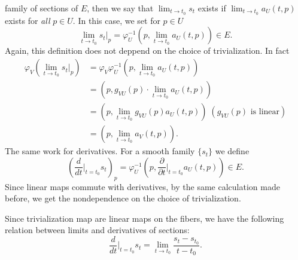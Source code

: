 family of sections of $E$, then we say that $\lim_{t\to t_0}s_t$ exists if $\lim_{t\to t_0}a_U(t,p)$ exists for \textit{all} $p \in U$. 
In this case, we set for $p\in U$
\begin{equation}
    \lim_{t\to t_0}s_t\big|_p=\varphi_U^{-1}(p,\lim_{t\to t_0}a_U(t,p)) \in E.
\end{equation}
Again, this definition does not deppend on the choice of trivialization. In fact 
\begin{equation}
    \begin{split}
        \varphi_V(\lim_{t\to t_0}s_t\big|_p)&=\varphi_V\varphi_U^{-1}(p,\lim_{t\to t_0}a_U(t,p))\\
        &=(p,g_{VU}(p)\cdot\lim_{t\to t_0}a_U(t,p))\\
        &=(p,\lim_{t\to t_0}g_{VU}(p)a_U(t,p))\;(g_{VU}(p)\text{ is linear})\\
        &=(p,\lim_{t\to t_0} a_V(t,p)).
    \end{split}
\end{equation}
The same work for derivatives. For a smooth family $\{s_t\}$ we define 
\begin{equation}
    (\frac{d}{dt}\bigg|_{t=t_0}s_t)_p=\varphi_U^{-1}(p,\frac{\partial}{\partial t}\bigg|_{t=t_0}a_U(t,p))\in E.
\end{equation}
Since linear maps commute with derivatives, by the same calculation made before, we get the nondependence on 
the choice of trivialization.

\begin{dang}
    \begin{remark}
    Since trivialization map are linear maps on the fibers, we have the following relation between limits and derivatives of 
    sections:
    \begin{equation}
        \frac{d}{dt}\bigg|_{t=t_0}s_t=\underset{t\to t_0}{\lim}\frac{s_t-s_{t_0}}{t-t_0}.
    \end{equation}
\end{remark}
\end{dang}

